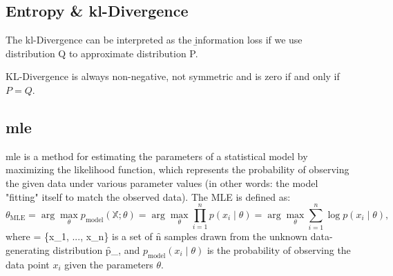 \subsection{Entropy \& \ac{kl}-Divergence}


The \ac{kl}-Divergence can be interpreted as the \b{information loss if we use distribution Q to approximate distribution P.}

KL-Divergence is always non-negative, not symmetric and is zero if and only if \( P = Q \).

\subsection{\ac{mle}}
\ac{mle} is a method for estimating the parameters of a statistical model by maximizing the likelihood function, which represents the probability of observing the given data under various parameter values (in other words: the model "fitting" itself to match the observed data). The MLE is defined as:
\[
\theta_{\text{MLE}} = \arg\max_{\theta} p_{\text{model}}(\mathbb{X};\theta) = \arg\max_{\theta} \prod_{i=1}^{n} p(x_i \mid \theta)= \arg\max_{\theta} \sum_{i=1}^{n} \log p(x_i \mid \theta),
\]
where \f{ = \{x_1, ..., x_n\}} is a set of \f{n} samples drawn from the unknown data-generating distribution \f{p_{}}, and \( p_{\text{model}}(x_i \mid \theta) \) is the probability of observing the data point \( x_i \) given the parameters \( \theta \).


